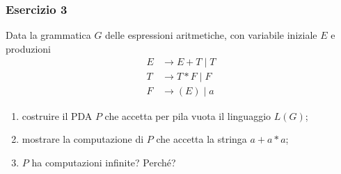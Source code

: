 \begin{frame}[fragile]
        \frametitle{Esercizio 3}
Data la grammatica $G$ delle espressioni aritmetiche, con variabile iniziale $E$ e produzioni
\begin{align*}
E & \to E + T \mid T\\
T & \to T * F \mid F\\
F & \to (E) \mid a
\end{align*}
\begin{enumerate}
\item costruire il PDA $P$ che accetta per pila vuota il linguaggio $L(G)$;
\item mostrare la computazione di $P$ che accetta la stringa $a+a*a$;
\item $P$ ha computazioni infinite? Perché?
\end{enumerate}
\end{frame}


